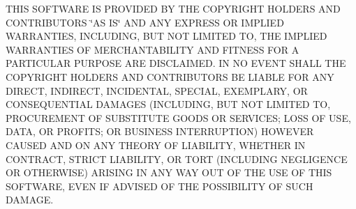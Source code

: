 T\-H\-I\-S S\-O\-F\-T\-W\-A\-R\-E I\-S P\-R\-O\-V\-I\-D\-E\-D B\-Y T\-H\-E C\-O\-P\-Y\-R\-I\-G\-H\-T H\-O\-L\-D\-E\-R\-S A\-N\-D C\-O\-N\-T\-R\-I\-B\-U\-T\-O\-R\-S \char`\"{}\-A\-S I\-S\char`\"{} A\-N\-D A\-N\-Y E\-X\-P\-R\-E\-S\-S O\-R I\-M\-P\-L\-I\-E\-D W\-A\-R\-R\-A\-N\-T\-I\-E\-S, I\-N\-C\-L\-U\-D\-I\-N\-G, B\-U\-T N\-O\-T L\-I\-M\-I\-T\-E\-D T\-O, T\-H\-E I\-M\-P\-L\-I\-E\-D W\-A\-R\-R\-A\-N\-T\-I\-E\-S O\-F M\-E\-R\-C\-H\-A\-N\-T\-A\-B\-I\-L\-I\-T\-Y A\-N\-D F\-I\-T\-N\-E\-S\-S F\-O\-R A P\-A\-R\-T\-I\-C\-U\-L\-A\-R P\-U\-R\-P\-O\-S\-E A\-R\-E D\-I\-S\-C\-L\-A\-I\-M\-E\-D. I\-N N\-O E\-V\-E\-N\-T S\-H\-A\-L\-L T\-H\-E C\-O\-P\-Y\-R\-I\-G\-H\-T H\-O\-L\-D\-E\-R\-S A\-N\-D C\-O\-N\-T\-R\-I\-B\-U\-T\-O\-R\-S B\-E L\-I\-A\-B\-L\-E F\-O\-R A\-N\-Y D\-I\-R\-E\-C\-T, I\-N\-D\-I\-R\-E\-C\-T, I\-N\-C\-I\-D\-E\-N\-T\-A\-L, S\-P\-E\-C\-I\-A\-L, E\-X\-E\-M\-P\-L\-A\-R\-Y, O\-R C\-O\-N\-S\-E\-Q\-U\-E\-N\-T\-I\-A\-L D\-A\-M\-A\-G\-E\-S (I\-N\-C\-L\-U\-D\-I\-N\-G, B\-U\-T N\-O\-T L\-I\-M\-I\-T\-E\-D T\-O, P\-R\-O\-C\-U\-R\-E\-M\-E\-N\-T O\-F S\-U\-B\-S\-T\-I\-T\-U\-T\-E G\-O\-O\-D\-S O\-R S\-E\-R\-V\-I\-C\-E\-S; L\-O\-S\-S O\-F U\-S\-E, D\-A\-T\-A, O\-R P\-R\-O\-F\-I\-T\-S; O\-R B\-U\-S\-I\-N\-E\-S\-S I\-N\-T\-E\-R\-R\-U\-P\-T\-I\-O\-N) H\-O\-W\-E\-V\-E\-R C\-A\-U\-S\-E\-D A\-N\-D O\-N A\-N\-Y T\-H\-E\-O\-R\-Y O\-F L\-I\-A\-B\-I\-L\-I\-T\-Y, W\-H\-E\-T\-H\-E\-R I\-N C\-O\-N\-T\-R\-A\-C\-T, S\-T\-R\-I\-C\-T L\-I\-A\-B\-I\-L\-I\-T\-Y, O\-R T\-O\-R\-T (I\-N\-C\-L\-U\-D\-I\-N\-G N\-E\-G\-L\-I\-G\-E\-N\-C\-E O\-R O\-T\-H\-E\-R\-W\-I\-S\-E) A\-R\-I\-S\-I\-N\-G I\-N A\-N\-Y W\-A\-Y O\-U\-T O\-F T\-H\-E U\-S\-E O\-F T\-H\-I\-S S\-O\-F\-T\-W\-A\-R\-E, E\-V\-E\-N I\-F A\-D\-V\-I\-S\-E\-D O\-F T\-H\-E P\-O\-S\-S\-I\-B\-I\-L\-I\-T\-Y O\-F S\-U\-C\-H D\-A\-M\-A\-G\-E.

